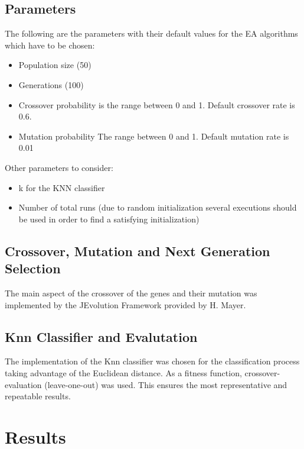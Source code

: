 \documentclass[11pt,onecolumn,a4paper]{article}
\begin{document}
\subsection{Parameters}

The following are the parameters with their default values for the EA algorithms which have to be chosen:

\begin{itemize}
\item {Population size (50)}
\item {Generations (100)}
\item {Crossover probability is the range between 0 and 1. Default crossover rate is 0.6.}
\item{Mutation probability  The range between 0 and 1. Default mutation rate is 0.01} 
\end{itemize}

Other parameters to consider:

\begin{itemize}

\item {k for the KNN classifier}
\item {Number of total runs (due to random initialization several executions should be used in order to find a satisfying initialization)}
\end{itemize}



\subsection{Crossover, Mutation and Next Generation Selection}
\label{sec:eval}
The main aspect of the crossover of the genes and their mutation was implemented by the JEvolution Framework \cite{mayer2} provided by H. Mayer. 

\subsection{Knn Classifier and Evalutation }
The implementation of the Knn classifier was chosen for the classification process taking advantage of the Euclidean distance. As a fitness function, crossover-evaluation (leave-one-out) was used. This ensures the most representative and repeatable results. 


\section{Results}
\end{document}
